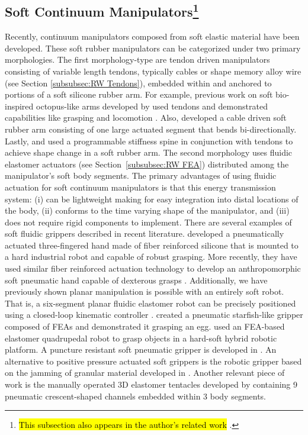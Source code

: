 \subsection[Soft Continuum Manipulators]{Soft Continuum Manipulators\footnote{\hl{This subsection also appears in the author's related work} \citet{marchese2015design}.}}
Recently, continuum manipulators composed from soft elastic material have been developed.
These soft rubber manipulators can be categorized under two primary morphologies.
The first morphology-type are tendon driven manipulators consisting of variable length tendons, typically cables or shape memory alloy wire (see Section \ref{subsubsec:RW Tendons}), embedded within and anchored to portions of a soft silicone rubber arm.
For example, previous work on soft bio-inspired octopus-like arms developed by \citet{calisti2010study} used tendons and demonstrated capabilities like grasping and locomotion \citep{laschi2012soft, calisti2011octopus}.
Also, \citet{wang2013visual} developed a cable driven soft rubber arm consisting of one large actuated segment that bends bi-directionally.
Lastly, \citet{mcevoy14shape} and \citet{mcevoy2014thermoplastic} used a programmable stiffness spine in conjunction with tendons to achieve shape change in a soft rubber arm.
The second morphology uses fluidic elastomer actuators (see Section~\ref{subsubsec:RW FEA}) distributed among the manipulator's soft body segments.
The primary advantages of using fluidic actuation for soft continuum manipulators is that this energy transmission system: (i) can be lightweight making for easy integration into distal locations of the body, (ii) conforms to the time varying shape of the manipulator, and (iii) does not require rigid components to implement.
There are several examples of soft fluidic grippers described in recent literature.
\citet{deimel2013compliant} developed a pneumatically actuated three-fingered hand made of fiber reinforced silicone that is mounted to a hard industrial robot and capable of robust grasping.
More recently, they have used similar fiber reinforced actuation technology to develop an anthropomorphic soft pneumatic hand capable of dexterous grasps \citep{deimel2014novel}.
Additionally, we have previously shown planar manipulation is possible with an entirely soft robot. That is, a six-segment planar fluidic elastomer robot can be precisely positioned using a closed-loop kinematic controller \citep{marchese2014design, marchese2014whole, katzschmann2015autonomous}.
\citet{ilievski2011soft} created a pneumatic starfish-like gripper composed of FEAs and demonstrated it grasping an egg.
\citet{Stokes2014hybrid} used an FEA-based elastomer quadrupedal robot to grasp objects in a hard-soft hybrid robotic platform.
A puncture resistant soft pneumatic gripper is developed in \citet{shepherd2013soft}.
An alternative to positive pressure actuated soft grippers is the robotic gripper based on the jamming of granular material developed in \citet{brown2010universal}.
Another relevant piece of work is the manually operated 3D elastomer tentacles developed by \citet{martinez2013robotic} containing 9 pneumatic crescent-shaped channels embedded within 3 body segments.

